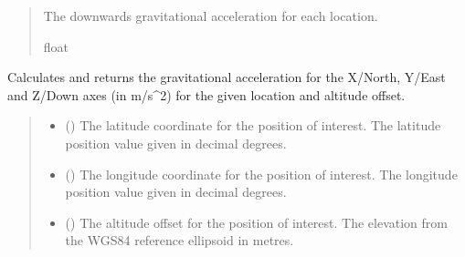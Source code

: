 \documentclass[letterpaper,10pt,english]{sphinxmanual}
\begin{document}
\begin{fulllineitems}
\begin{fulllineitems}
\begin{quote}
\begin{description}
\begin{itemize}
\end{itemize}

\sphinxAtStartPar
The downwards gravitational acceleration for each location.

\sphinxAtStartPar
float

\end{description}\end{quote}

\end{fulllineitems}


\begin{fulllineitems}
\label{\detokenize{modules/gravity/somigliana:qnav.gravity.somigliana.Somigliana.calc_gravity_xyz}}
\pysigstartsignatures
{}
\pysigstopsignatures
\sphinxAtStartPar
Calculates and returns the gravitational acceleration for the
X/North, Y/East and Z/Down axes (in m/s\textasciicircum{}2) for the given location
and altitude offset.
\begin{quote}\begin{description}
\begin{itemize}
\item {} 
\sphinxAtStartPar
{} () \textendash{} The latitude coordinate for the position of interest.
The latitude position value given in decimal degrees.

\item {} 
\sphinxAtStartPar
{} () \textendash{} The longitude coordinate for the position of interest.
The longitude position value given in decimal degrees.

\item {} 
\sphinxAtStartPar
{} () \textendash{} The altitude offset for the position of interest.
The elevation from the WGS\sphinxhyphen{}84 reference ellipsoid in metres.


\end{itemize}
\end{description}
\end{quote}
\end{fulllineitems}
\end{fulllineitems}
\end{document}
